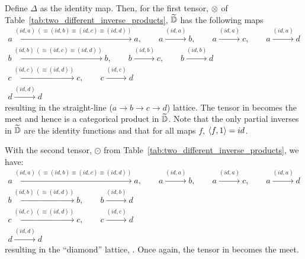 Define $\Delta$ as the identity map. Then, for the first tensor, $\otimes$ of
Table~\ref{tab:two_different_inverse_products}, $\widetilde{\mathbb{D}}$ has the following
maps
\begin{align*}
  a \xrightarrow{(id,a)\ (\equiv (id, b) \equiv (id,c) \equiv (id,d))} a, \qquad a
    \xrightarrow{(id,a)} b, \qquad a \xrightarrow{(id, a)} c , \qquad a \xrightarrow{(id, a)} d \\
  b \xrightarrow{(id,b) \ (\equiv (id, c) \equiv (id, d))} b , \qquad b \xrightarrow{(id,b)} c,
    \qquad b \xrightarrow{(id,b)} d\\
  c \xrightarrow{(id, c) \ (\equiv (id, d))} c ,   \qquad c \xrightarrow{(id,c)} d\\
  d \xrightarrow{(id,d)} d
\end{align*}
resulting in the straight-line ($a \to b \to c \to d$) lattice. The tensor in \D becomes the meet
and hence is a categorical product in $\widetilde{\mathbb{D}}$. Note that the only partial inverses in
$\widetilde{\mathbb{D}}$ are the identity functions and that for all maps $f$, $\langle f,1\rangle = id$.

With the second tensor, $\odot$ from Table~\ref{tab:two_different_inverse_products}, we have:
\begin{align*}
  a \xrightarrow{(id,a) \ (\equiv (id, b) \equiv (id,c) \equiv (id,d))} a, \qquad
    a \xrightarrow{(id,a)} b, \qquad a \xrightarrow{(id, a)} c , \qquad a \xrightarrow{(id, a)} d \\
  b \xrightarrow{(id,b) \ (\equiv (id, d))} b ,  \qquad b \xrightarrow{(id,b)} d\\
  c \xrightarrow{(id, c) \ (\equiv (id, d))} c,   \qquad c \xrightarrow{(id,c)} d\\
  d \xrightarrow{(id,d)} d
\end{align*}
resulting in the ``diamond'' lattice, . Once again, the tensor in \D becomes the meet.

